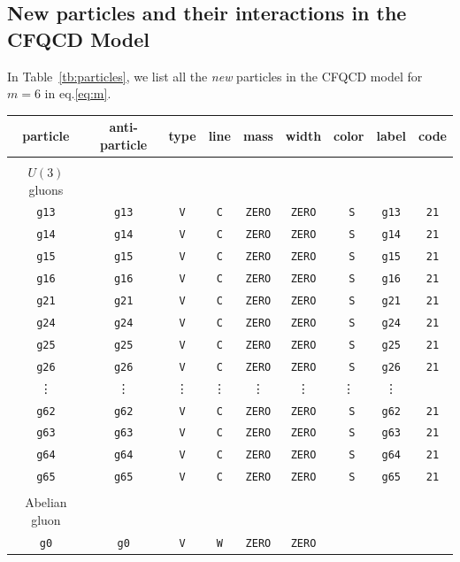 \documentclass[a4paper,11pt]{article}
\begin{document}
\subsection{New particles and their interactions in the CFQCD Model}
In Table~\ref{tb:particles}, we list all the {\it new} particles in the CFQCD
model for $m=6$ in eq.\eqref{eq:m}.
\begin{table}
\begin{center}
\small
\begin{tabular}{ccccccccc}
\hline\hline
particle & anti-particle & type & line & mass & width & color & label &
 code\\
\hline\\
$U(3)$ gluons\\
{\tt g13}&{\tt g13}& {\tt V}&{\tt C}& {\tt ZERO} &{\tt ZERO}&{\tt
			 S}&{\tt g13}&{\tt 21}\\
{\tt g14}&{\tt g14}& {\tt V}&{\tt C}& {\tt ZERO} &{\tt ZERO}&{\tt
			 S}&{\tt g14}&{\tt 21}\\
{\tt g15}&{\tt g15}& {\tt V}&{\tt C}& {\tt ZERO} &{\tt ZERO}&{\tt
			 S}&{\tt g15}&{\tt 21}\\
{\tt g16}&{\tt g16}& {\tt V}&{\tt C}& {\tt ZERO} &{\tt ZERO}&{\tt
			 S}&{\tt g16}&{\tt 21}\\
{\tt g21}&{\tt g21}& {\tt V}&{\tt C}& {\tt ZERO} &{\tt ZERO}&{\tt
			 S}&{\tt g21}&{\tt 21}\\
{\tt g24}&{\tt g24}& {\tt V}&{\tt C}& {\tt ZERO} &{\tt ZERO}&{\tt
			 S}&{\tt g24}&{\tt 21}\\
{\tt g25}&{\tt g25}& {\tt V}&{\tt C}& {\tt ZERO} &{\tt ZERO}&{\tt
			 S}&{\tt g25}&{\tt 21}\\
{\tt g26}&{\tt g26}& {\tt V}&{\tt C}& {\tt ZERO} &{\tt ZERO}&{\tt
			 S}&{\tt g26}&{\tt 21}\\
\vdots&\vdots&\vdots&\vdots&\vdots&\vdots&\vdots&\vdots&\\
{\tt g62}&{\tt g62}& {\tt V}&{\tt C}& {\tt ZERO} &{\tt ZERO}&{\tt
			 S}&{\tt g62}&{\tt 21}\\
{\tt g63}&{\tt g63}& {\tt V}&{\tt C}& {\tt ZERO} &{\tt ZERO}&{\tt
			 S}&{\tt g63}&{\tt 21}\\
{\tt g64}&{\tt g64}& {\tt V}&{\tt C}& {\tt ZERO} &{\tt ZERO}&{\tt
			 S}&{\tt g64}&{\tt 21}\\
{\tt g65}&{\tt g65}& {\tt V}&{\tt C}& {\tt ZERO} &{\tt ZERO}&{\tt
			 S}&{\tt g65}&{\tt 21}\\\\
Abelian gluon\\
{\tt g0}&{\tt g0}& {\tt V}&{\tt W}& {\tt ZERO} &{\tt ZERO}&{\tt
}
\end{tabular}
\end{center}
\end{table}
\end{document}
